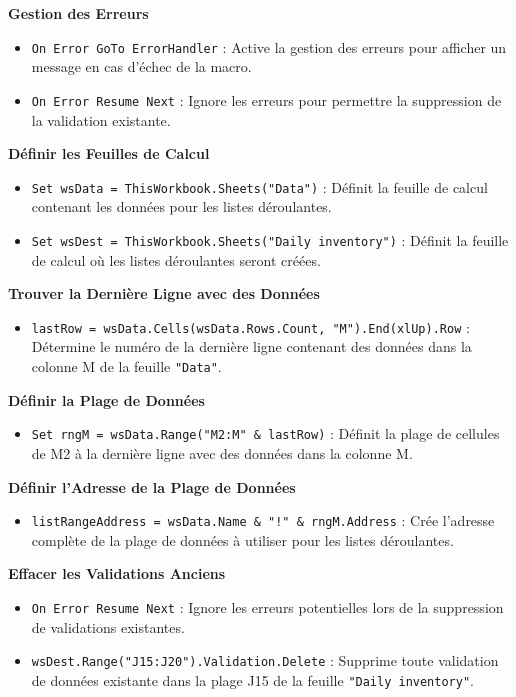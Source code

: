 \documentclass[a4paper, oneside, 12pt, final]{extreport}
\begin{document}
\textbf{Gestion des Erreurs}

\begin{itemize}
    \item \texttt{On Error GoTo ErrorHandler} : Active la gestion des erreurs pour afficher un message en cas d'échec de la macro.
    \item \texttt{On Error Resume Next} : Ignore les erreurs pour permettre la suppression de la validation existante.
\end{itemize}

\textbf{Définir les Feuilles de Calcul}

\begin{itemize}
    \item \texttt{Set wsData = ThisWorkbook.Sheets("Data")} : Définit la feuille de calcul contenant les données pour les listes déroulantes.
    \item \texttt{Set wsDest = ThisWorkbook.Sheets("Daily inventory")} : Définit la feuille de calcul où les listes déroulantes seront créées.
\end{itemize}

\textbf{Trouver la Dernière Ligne avec des Données}

\begin{itemize}
    \item \texttt{lastRow = wsData.Cells(wsData.Rows.Count, "M").End(xlUp).Row} : Détermine le numéro de la dernière ligne contenant des données dans la colonne M de la feuille \texttt{"Data"}.
\end{itemize}

\textbf{Définir la Plage de Données}

\begin{itemize}
    \item \texttt{Set rngM = wsData.Range("M2:M" \& lastRow)} : Définit la plage de cellules de M2 à la dernière ligne avec des données dans la colonne M.
\end{itemize}

\textbf{Définir l'Adresse de la Plage de Données}

\begin{itemize}
    \item \texttt{listRangeAddress = wsData.Name \& "!" \& rngM.Address} : Crée l'adresse complète de la plage de données à utiliser pour les listes déroulantes.
\end{itemize}

\textbf{Effacer les Validations Anciens}

\begin{itemize}
    \item \texttt{On Error Resume Next} : Ignore les erreurs potentielles lors de la suppression de validations existantes.
    \item \texttt{wsDest.Range("J15:J20").Validation.Delete} : Supprime toute validation de données existante dans la plage J15 de la feuille \texttt{"Daily inventory"}.
\end{itemize}
\end{document}
